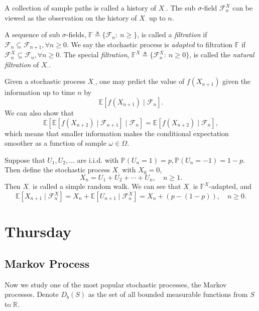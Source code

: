 A collection of sample paths is called a history of $X_{\cdot}$.
The sub $\sigma$-field $\mathcal{F}_n^X$ can be viewed as the observation on the history of $X_{\cdot}$ up to $n$.

\begin{definition}[Filtration]
A sequence of sub $\sigma$-fields, $\mathbb{F}\triangleq \{\mathcal{F}_n:~n\ge\}$,
is called a \emph{filtration} if $\mathcal{F}_n\subseteq\mathcal{F}_{n+1},\forall n\ge0$.
We say the stochastic process is \emph{adapted} to filtration $\mathbb{F}$ if $\mathcal{F}_n^X\subseteq\mathcal{F}_n,\forall n\ge0$.
The special \emph{filtration}, $\mathbb{F}^X\triangleq \{\mathcal{F}_n^X:~n\ge0\}$, is called the \emph{natural filtration} of $X_{\cdot}$.
\end{definition}

Given a stochastic process $X_{\cdot}$, one may prdict the value of $f(X_{n+1})$ given the information up to time $n$ by
\[
\mathbb{E}[f(X_{n+1})\mid\mathcal{F}_n].
\]
We can also show that
\[\mathbb{E}
[
\mathbb{E}[f(X_{n+2})\mid\mathcal{F}_{n+1}]\mid\mathcal{F}_n
]=\mathbb{E}[f(X_{n+2})\mid\mathcal{F}_{n}],
\]
which means that smaller information makes the conditional expectation smoother as a function of sample $\omega\in\Omega$.

\begin{example}
Suppose that $U_1,U_2,\ldots$ are i.i.d. with $\mathbb{P}(U_n=1)=p, \mathbb{P}(U_n=-1)=1-p$.
Then define the stochastic process $X_{\cdot}$ with $X_0=0$,
\[
X_n = U_1+U_2+\cdots+U_n,\quad n\ge1.
\]
Then $X_{\cdot}$ is called a simple random walk.
We can see that $X_{\cdot}$ is $\mathbb{F}^X$-adapted, and
\[
\mathbb{E}[X_{n+1}\mid\mathcal{F}_n^X] = X_n + \mathbb{E}[U_{n+1}\mid\mathcal{F}_n^X]=X_n+(p-(1-p)),\quad n\ge0.
\]
\end{example}


\section{Thursday}
\subsection{Markov Process}
Now we study one of the most popular stochastic processes, the Markov processes.
Denote $D_b(S)$ as the set of all bounded measurable functions from $S$ to $\mathbb{R}$.

